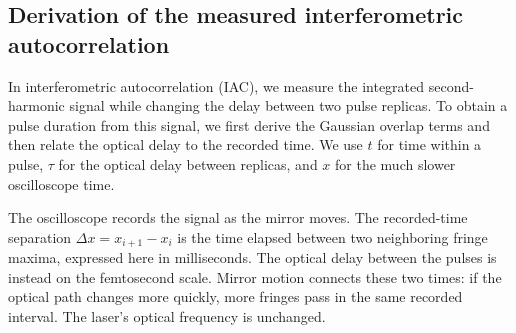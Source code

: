 \subsection{Derivation of the measured interferometric autocorrelation}
\label{sec:iac-derivation}
In interferometric autocorrelation (IAC), we measure the integrated second-harmonic signal while changing the delay between two pulse replicas. To obtain a pulse duration from this signal, we first derive the Gaussian overlap terms and then relate the optical delay to the recorded time. We use $t$ for time within a pulse, $\tau$ for the optical delay between replicas, and $x$ for the much slower oscilloscope time.

The oscilloscope records the signal as the mirror moves. The recorded-time separation $\Delta x=x_{i+1}-x_i$ is the time elapsed between two neighboring fringe maxima, expressed here in milliseconds. The optical delay between the pulses is instead on the femtosecond scale. Mirror motion connects these two times: if the optical path changes more quickly, more fringes pass in the same recorded interval. The laser's optical frequency is unchanged.

